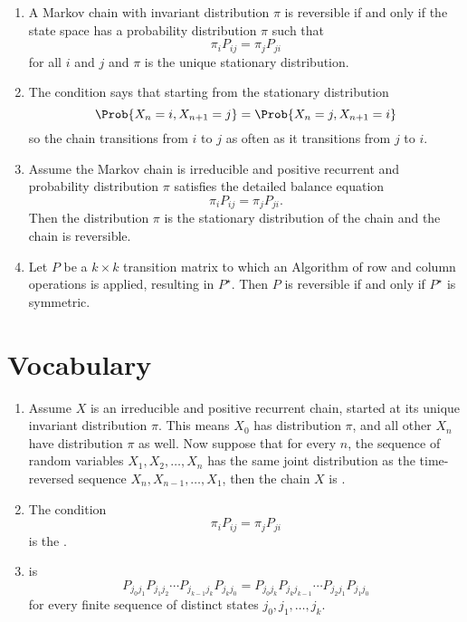 \documentclass[12pt]{article}
\begin{document}
\begin{enumerate}
    \item
        A Markov chain with invariant distribution \( \pi \) is
        reversible if and only if the state space has a probability
        distribution \( \pi \) such that
        \[
            \pi_i P_{ij} = \pi_j P_{ji}
        \] for all \( i \) and \( j \) and \( \pi \) is the unique
        stationary distribution.
    \item
        The condition says that starting from the stationary
        distribution
        \[
            \Prob{X_n =i, X_{n+1} = j} = \Prob{X_n =j, X_{n+1} = i}
        \] so the chain transitions from \( i \) to \( j \) as often as
        it transitions from \( j \) to \( i \).
    \item
        Assume the Markov chain is irreducible and positive recurrent
        and probability distribution \( \pi \) satisfies the detailed
        balance equation
        \[
            \pi_i P_{ij} = \pi_j P_{ji}.
        \] Then the distribution \( \pi \) is the stationary
        distribution of the chain and the chain is reversible.
    \item
        Let \( P \) be a \( k \times k \) transition matrix to which an
        Algorithm of row and column operations is applied, resulting in \(
        P^{\star} \).  Then \( P \) is reversible if and only if \( P^{\star}
        \) is symmetric.
\end{enumerate}

\hr

\section*{Vocabulary}
\begin{enumerate}
    \item
        Assume \( X \) is an irreducible and positive recurrent chain,
        started at its unique invariant distribution \( \pi \).  This
        means \( X_0 \) has distribution \( \pi \), and all other \( X_n
        \) have distribution \( \pi \) as well.  Now suppose that for
        every \( n \), the sequence of random variables \( X_1, X_2,
        \dots , X_n \) has the same joint distribution as the
        time-reversed sequence \( X_n, X_{n-1}, \dots , X_1 \), then the
        chain \( X \) is .
    \item
        The condition
        \[
            \pi_i P_{ij} = \pi_j P_{ji}
        \] is the .
    \item
         is
        \[
            P_{j_0 j_1} P_{j_1 j_2} \cdots P_{j_{k-1} j_k} P_{j_k j_0} =
            P_{j_0 j_k} P_{j_k j_{k-1}} \cdots P_{j_2 j_1} P_{j_1 j_0}
        \] for every finite sequence of distinct states \( j_0, j_1,
        \dots, j_k \).
\end{enumerate}
\end{document}
